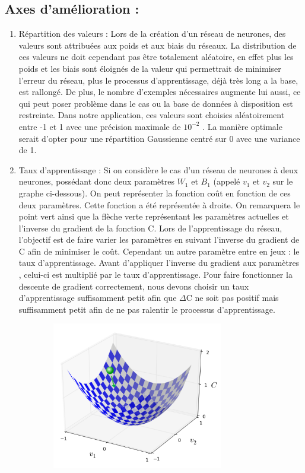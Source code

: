 \documentclass{article}
\begin{document}
\subsection{Axes d'amélioration :}
	\begin{enumerate}
			\item Répartition des valeurs :
			Lors de la création d'un réseau de neurones, des valeurs sont attribuées aux poids et aux biais du réseaux. La distribution de ces valeurs ne doit cependant pas être totalement aléatoire, en effet plus les poids et les biais sont éloignés de la valeur qui permettrait de minimiser l'erreur du réseau, plus le processus d'apprentissage, déjà très long a la base, est rallongé. 
De plus, le nombre d'exemples nécessaires augmente lui aussi, ce qui peut poser problème dans le cas ou la base de données à disposition est restreinte. 
Dans notre application, ces valeurs sont choisies aléatoirement entre -1 et 1 avec une précision maximale de $10^{-2}$ . La manière optimale serait d'opter pour une répartition Gaussienne centré sur 0 avec une variance de 1.
			\item Taux d'apprentissage :
			Si on considère le cas d'un réseau de neurones à deux neurones, possédant donc deux paramètres
$W_1$ et $B_1$ (appelé $v_1$ et $v_2$ sur le graphe ci-dessous). On peut représenter la fonction coût en fonction de ces
deux paramètres. Cette fonction a été représentée à droite. On remarquera le point vert ainsi que la flèche verte représentant les paramètres actuelles et l'inverse du gradient de la fonction C.
Lors de l'apprentissage du réseau, l'objectif est de faire varier les paramètres en suivant l'inverse du gradient de C afin de minimiser le coût.
Cependant un autre paramètre entre en jeux : le taux d'apprentissage. Avant d'appliquer l'inverse du gradient aux paramètres , celui-ci est multiplié par le taux  d'apprentissage. 
Pour faire fonctionner la descente de gradient correctement, nous devons choisir un taux d'apprentissage suffisamment petit afin que $\Delta$C ne soit pas positif mais suffisamment petit afin de ne pas ralentir le processus d'apprentissage.
				\begin{center} 
				\includegraphics[height=244, width=400]{courbe.png}

\end{center}
\end{enumerate}
\end{document}
